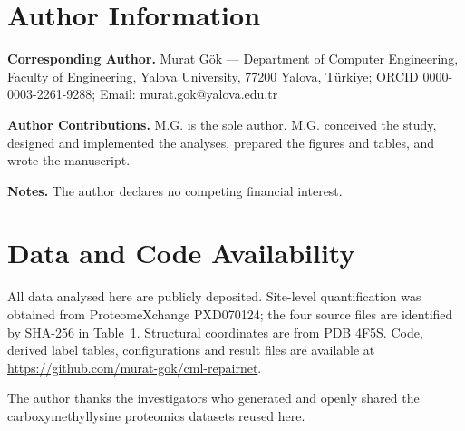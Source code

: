\documentclass[journal=jprobs,manuscript=article,layout=traditional]{achemso}
\begin{document}
\section*{Author Information}

\textbf{Corresponding Author.} Murat G\"ok --- Department of Computer Engineering, Faculty of Engineering, Yalova University, 77200 Yalova, T\"urkiye; ORCID 0000-0003-2261-9288; Email: murat.gok@yalova.edu.tr

\textbf{Author Contributions.} M.G. is the sole author. M.G. conceived the study, designed and implemented the analyses, prepared the figures and tables, and wrote the manuscript.

\textbf{Notes.} The author declares no competing financial interest.

\section*{Data and Code Availability}

All data analysed here are publicly deposited. Site-level quantification was obtained from ProteomeXchange PXD070124; the four source files are identified by SHA-256 in Table~1. Structural coordinates are from PDB 4F5S. Code, derived label tables, configurations and result files are available at \url{https://github.com/murat-gok/cml-repairnet}.

\begin{acknowledgement}

The author thanks the investigators who generated and openly shared the carboxymethyllysine proteomics datasets reused here.

\end{acknowledgement}


\end{document}
